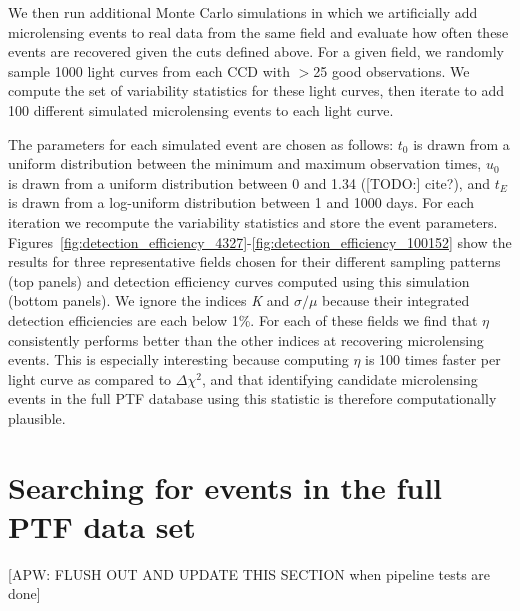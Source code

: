 \documentclass{emulateapj}
\newcommand{\apwsim}{\raisebox{0.2ex}{\scriptsize$\sim$\normalsize}}
\begin{document}
We then run additional Monte Carlo simulations in which we artificially add microlensing events to real data from the same field and evaluate how often these events are recovered given the cuts defined above. For a given field, we randomly sample 1000 light curves from each CCD with $>$25 good observations. We compute the set of variability statistics for these light curves, then iterate to add 100 different simulated microlensing events to each light curve. 

The parameters for each simulated event are chosen as follows: $t_0$ is drawn from a uniform distribution between the minimum and maximum observation times, $u_0$ is drawn from a uniform distribution between 0 and 1.34 ([TODO:] cite?), and $t_E$ is drawn from a log-uniform distribution between 1 and 1000 days. For each iteration we recompute the variability statistics and store the event parameters. Figures~\ref{fig:detection_efficiency_4327}-\ref{fig:detection_efficiency_100152} show the results for three representative fields chosen for their different sampling patterns (top panels) and detection efficiency curves computed using this simulation (bottom panels). We ignore the indices \textit{K} and $\sigma/\mu$ because their integrated detection efficiencies are each below 1\%. For each of these fields we find that $\eta$ consistently performs better than the other indices at recovering microlensing events. This is especially interesting because computing $\eta$ is \apwsim100 times faster per light curve as compared to $\Delta\chi^2$, and that identifying candidate microlensing events in the full PTF database using this statistic is therefore computationally plausible.



\section{Searching for events in the full PTF data set}
[APW:  FLUSH OUT AND UPDATE THIS SECTION when pipeline tests are done]
\end{document}
